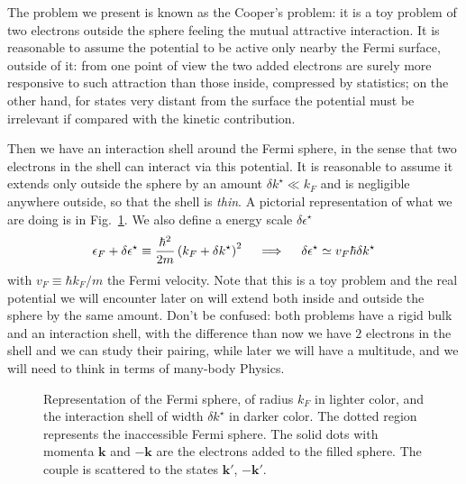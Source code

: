 The problem we present is known as the Cooper's problem: it is a toy problem of two electrons outside the sphere feeling the mutual attractive interaction. It is reasonable to assume the potential to be active only nearby the Fermi surface, outside of it: from one point of view the two added electrons are surely more responsive to such attraction than those inside, compressed by statistics; on the other hand, for states very distant from the surface the potential must be irrelevant if compared with the kinetic contribution.

Then we have an interaction shell around the Fermi sphere, in the sense that two electrons in the shell can interact via this potential. It is reasonable to assume it extends only outside the sphere by an amount $\delta k^\star \ll k_F$ and is negligible anywhere outside, so that the shell is \textit{thin}. A pictorial representation of what we are doing is in Fig.~\ref{fig:fermi sphere and shell}. We also define a energy scale $\delta\epsilon^\star$
\[
	\epsilon_F + \delta\epsilon^\star \equiv \frac{\hbar^2}{2m} \left({k_F + \delta k^\star}\right)^2
	\quad\implies\quad
	\delta\epsilon^\star \simeq v_F \hbar \delta k^\star
\]
with $v_F \equiv \hbar k_F/m$ the Fermi velocity. Note that this is a toy problem and the real potential we will encounter later on will extend both inside and outside the sphere by the same amount. Don't be confused: both problems have a rigid bulk and an interaction shell, with the difference than now we have $2$ electrons in the shell and we can study their pairing, while later we will have a multitude, and we will need to think in terms of many-body Physics.

\begin{figure}
	\centering
	
	\caption{Representation of the Fermi sphere, of radius $k_F$ in lighter color, and the interaction shell of width $\delta k^\star$ in darker color. The dotted region represents the inaccessible Fermi sphere. The solid dots with momenta $\mathbf{k}$ and $-\mathbf{k}$ are the electrons added to the filled sphere. The couple is scattered to the states $\mathbf{k}'$, $-\mathbf{k}'$.}
	\label{fig:fermi sphere and shell}
\end{figure}


